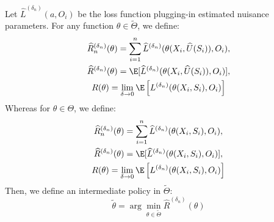 Let $\widehat L^{({\delta_n})}(a,O_i)$ be the loss function plugging-in estimated nuisance parameters. For any function $\theta\in \widetilde\Theta$, we define:
\begin{gather}
   \widehat R_n^{({\delta_n})}(\theta) = \sum_{i=1}^n\widehat L^{({\delta_n})}(\theta(X_i,\widehat U(S_i)),O_i),\nonumber\\
   \widehat R^{({\delta_n})}(\theta) = \E[\widehat L^{({\delta_n})}(\theta(X_i,\widehat U(S_i)),O_i)], \nonumber\\
   R(\theta) = \lim_{\delta\rightarrow 0}\E\left[L^{(\delta_n)}(\theta(X_i,S_i),O_i)\right]
   \nonumber\label{eq:plug_in_risk}
\end{gather}
Whereas for $\theta\in\Theta$, we define:
\begin{gather*}
 \widehat R_n^{({\delta_n})}(\theta) = \sum_{i=1}^n\widehat L^{({\delta_n})}(\theta(X_i,S_i),O_i),\nonumber\\
   \widehat R^{({\delta_n})}(\theta) = \E[\widehat L^{({\delta_n})}(\theta(X_i,S_i),O_i)], \nonumber\\
    R(\theta) = \lim_{\delta\rightarrow 0}\E\left[L^{(\delta_n)}(\theta(X_i,S_i),O_i)\right]\nonumber
\end{gather*}
Then, we define an intermediate policy in $\widetilde\Theta$:
\begin{equation}\label{eq:different_thetas}
    \tilde \theta = \arg\min_{\theta\in \widetilde\Theta} \widehat R^{({\delta_n})}(\theta)
\end{equation}



